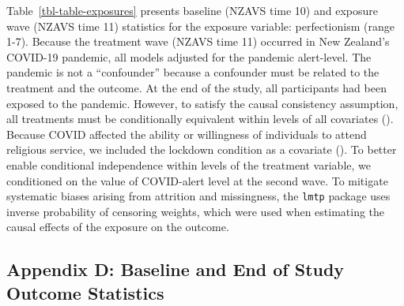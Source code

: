\documentclass[
  singlecolumn]{article}
\begin{document}
Table~\ref{tbl-table-exposures} presents baseline (NZAVS time 10) and
exposure wave (NZAVS time 11) statistics for the exposure variable:
perfectionism (range 1-7). Because the treatment wave (NZAVS time 11)
occurred in New Zealand's COVID-19 pandemic, all models adjusted for the
pandemic alert-level. The pandemic is not a ``confounder'' because a
confounder must be related to the treatment and the outcome. At the end
of the study, all participants had been exposed to the pandemic.
However, to satisfy the causal consistency assumption, all treatments
must be conditionally equivalent within levels of all covariates
(). Because
COVID affected the ability or willingness of individuals to attend
religious service, we included the lockdown condition as a covariate
(). To better enable
conditional independence within levels of the treatment variable, we
conditioned on the value of COVID-alert level at the second wave. To
mitigate systematic biases arising from attrition and missingness, the
\texttt{lmtp} package uses inverse probability of censoring weights,
which were used when estimating the causal effects of the exposure on
the outcome.

\subsection{Appendix D: Baseline and End of Study Outcome
Statistics}\label{appendix-outcomes}
\end{document}
